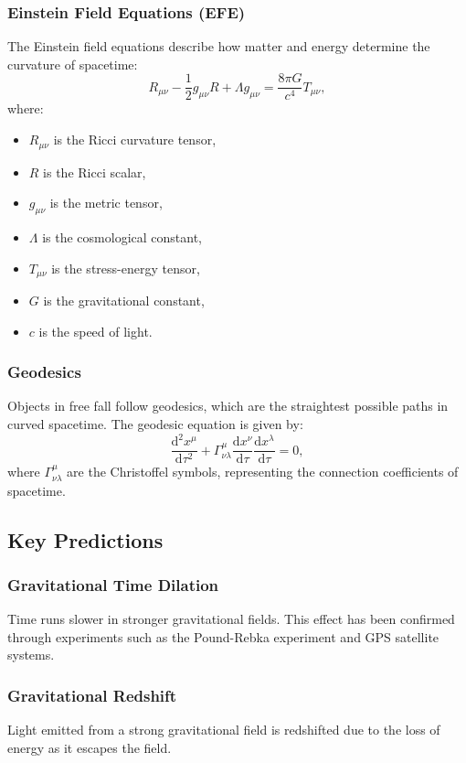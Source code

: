 \subsubsection{Einstein Field Equations (EFE)}
The Einstein field equations describe how matter and energy determine the curvature of spacetime:
\[
R_{\mu \nu} - \frac{1}{2} g_{\mu \nu} R + \Lambda g_{\mu \nu} = \frac{8 \pi G}{c^4} T_{\mu \nu},
\]
where:
\begin{itemize}
  \item $R_{\mu \nu}$ is the Ricci curvature tensor,
  \item $R$ is the Ricci scalar,
  \item $g_{\mu \nu}$ is the metric tensor,
  \item $\Lambda$ is the cosmological constant,
  \item $T_{\mu \nu}$ is the stress-energy tensor,
  \item $G$ is the gravitational constant,
  \item $c$ is the speed of light.
\end{itemize}

\subsubsection{Geodesics}
Objects in free fall follow geodesics, which are the straightest possible paths in curved spacetime. The geodesic equation is given by:
\[
\frac{\mathrm{d}^2 x^{\mu}}{\mathrm{d}\tau^2} + \Gamma^{\mu}_{\nu \lambda} \frac{\mathrm{d}x^{\nu}}{\mathrm{d}\tau} \frac{\mathrm{d}x^{\lambda}}{\mathrm{d}\tau} = 0,
\]
where $\Gamma^{\mu}_{\nu \lambda}$ are the Christoffel symbols, representing the connection coefficients of spacetime.


\subsection{Key Predictions}

\subsubsection{Gravitational Time Dilation}
Time runs slower in stronger gravitational fields. This effect has been confirmed through experiments such as the Pound-Rebka experiment and GPS satellite systems.

\subsubsection{Gravitational Redshift}
Light emitted from a strong gravitational field is redshifted due to the loss of energy as it escapes the field.

